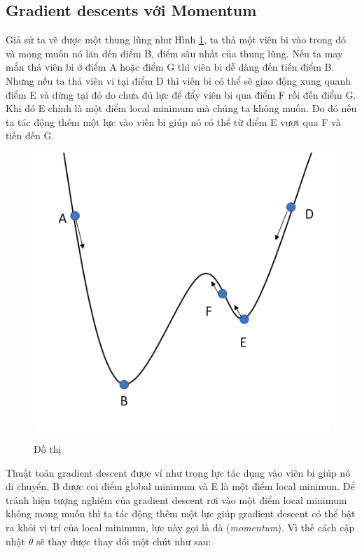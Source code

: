 \subsection{Gradient descents với Momentum}
  Giả sử ta vẽ được một thung lũng như Hình \ref{fig:dothi}, ta thả một viên bi vào trong đó và mong muốn nó lăn đến điểm B, điểm sâu nhất của thung lũng. Nếu ta may mắn thả viên bi ở điểm A hoặc điểm G thì viên bi dễ dàng đến tiến điểm B. Nhưng nếu ta thả viên vi tại điểm D thì viên bi có thể sẽ giao động xung quanh điểm E và dừng tại đó do chưa đủ lực để đẩy viên bi qua điểm F rồi đến điểm G. Khi đó E chính là một điểm local minimum mà chúng ta không muốn. Do đó nếu ta tác động thêm một lực vào viên bi giúp nó có thể từ điểm E vượt qua F và tiến đến G. 
\begin{figure}[H]
\begin{center}
\label{fig:dothi}
\includegraphics[scale=1]{chap3/image/momentum.png}
\caption{Đồ thị }
\end{center}
\end{figure}
Thuật toán gradient descent được ví như trọng lực tác dụng vào viên bi giúp nó di chuyển, B được coi điểm global minimum và E là một điểm local minimun. Để tránh hiện tượng nghiệm của gradient descent rơi vào một điểm local minimum không mong muốn thì ta tác động thêm một lực giúp gradient descent có thể bật ra khỏi vị trí của local minimum, lực này gọi là đà (\textit{momentum}). Vì thế cách cập nhật $\theta$ sẽ thay được thay đổi một chút như sau:
